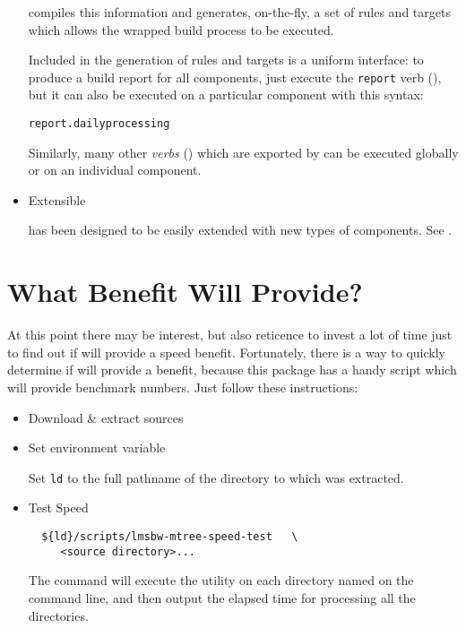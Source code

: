 \begin{itemize}
  \lmsbw compiles this information and generates, on-the-fly, a set of
  \make rules and targets which allows the wrapped build process to be
  executed.

  Included in the generation of rules and targets is a uniform
  interface: to produce a build report for all components, just
  execute the \texttt{report} verb (), but it
  can also be executed on a particular component with this syntax:

  \begin{center}
    \texttt{report.dailyprocessing}
  \end{center}

  Similarly, many other \emph{verbs} () which
  are exported by \lmsbw can be executed globally or on an individual
  component.

\item Extensible

  \lmsbw has been designed to be easily extended with new types of
  components.  See .
\end{itemize}

\section{What Benefit Will \lmsbw Provide?}

At this point there may be interest, but also reticence to invest a
lot of time just to find out if \lmsbw will provide a speed benefit.
Fortunately, there is a way to quickly determine if \lmsbw will
provide a benefit, because this package has a handy script which will
provide benchmark numbers.  Just follow these instructions:

\begin{itemize}
\item Download \& extract \lmsbw sources

\item Set environment variable

  Set \texttt{ld} to the full pathname of the directory to which
  \lmsbw was extracted.

\item Test Speed

\begin{verbatim}
  ${ld}/scripts/lmsbw-mtree-speed-test   \
     <source directory>...
\end{verbatim}

  The command will execute the \mtree utility on each directory named
  on the command line, and then output the elapsed time for processing
  all the directories.

\end{itemize}

